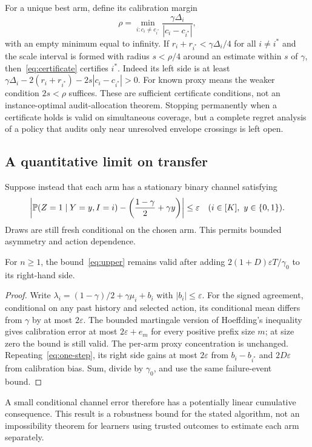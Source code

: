 For a unique best arm, define its calibration margin
\begin{equation}
\rho=\min_{i:c_i\ne c_{i^*}}
\frac{\gamma\Delta_i}{|c_i-c_{i^*}|},
\label{eq:margin}
\end{equation}
with an empty minimum equal to infinity. If $r_i+r_{i^*}<\gamma\Delta_i/4$ for all $i\ne i^*$ and the scale interval is formed with radius $s<\rho/4$ around an estimate within $s$ of $\gamma$, then~\eqref{eq:certificate} certifies $i^*$. Indeed its left side is at least
$\gamma\Delta_i-2(r_i+r_{i^*})-2s|c_i-c_{i^*}|>0$.
For known proxy means the weaker condition $2s<\rho$ suffices. These are sufficient certificate conditions, not an instance-optimal audit-allocation theorem. Stopping permanently when a certificate holds is valid on simultaneous coverage, but a complete regret analysis of a policy that audits only near unresolved envelope crossings is left open.

\subsection{A quantitative limit on transfer}
Suppose instead that each arm has a stationary binary channel satisfying
\begin{equation}
\left|\mathbb{P}(Z=1\mid Y=y,I=i)-\left(\frac{1-\gamma}{2}+\gamma y\right)\right|
\leq\varepsilon\quad (i\in[K],\ y\in\{0,1\}).
\label{eq:misspec}
\end{equation}
Draws are still fresh conditional on the chosen arm. This permits bounded asymmetry and action dependence.
\begin{proposition}\label{prop:robust}
For $n\geq1$, the bound~\eqref{eq:upper} remains valid after adding
$2(1+D)\varepsilon T/\gamma_0$ to its right-hand side.
\end{proposition}
\begin{proof}
Write $\lambda_i=(1-\gamma)/2+\gamma\mu_i+b_i$ with $|b_i|\leq\varepsilon$. For the signed agreement, conditional on any past history and selected action, its conditional mean differs from $\gamma$ by at most $2\varepsilon$. The bounded martingale version of Hoeffding's inequality gives calibration error at most $2\varepsilon+e_m$ for every positive prefix size $m$; at size zero the bound is still valid. The per-arm proxy concentration is unchanged. Repeating~\eqref{eq:one-step}, its right side gains at most $2\varepsilon$ from $b_i-b_{i^*}$ and $2D\varepsilon$ from calibration bias. Sum, divide by $\gamma_0$, and use the same failure-event bound.
\end{proof}
A small conditional channel error therefore has a potentially linear cumulative consequence. This result is a robustness bound for the stated algorithm, not an impossibility theorem for learners using trusted outcomes to estimate each arm separately.

